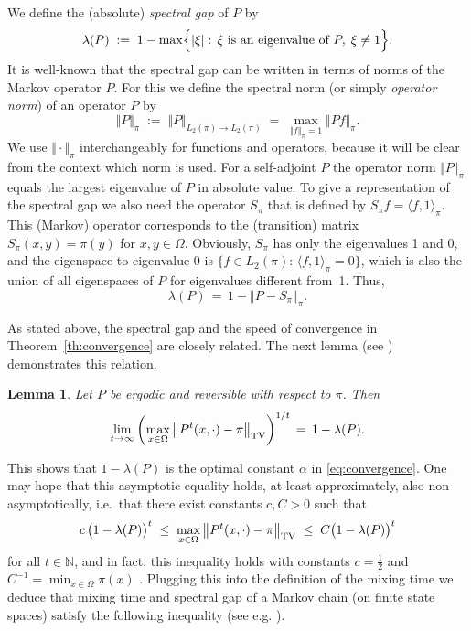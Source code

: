 \documentclass{dis}
\newtheorem{lemma}[theorem]{Lemma}
\theoremstyle{citing}
\begin{document}
We define the (absolute) 
\emph{spectral gap} 
of $P$ by 
\[
\lambda(P) \;:=\; 1 - \max\Bigl\{{\left\vert {\xi} \right\vert}:\, \xi 
		\text{ is an eigenvalue of } P,\; \xi\neq1\Bigr\}.
\]
It is well-known that the spectral gap can be written in terms 
of norms of the Markov operator $P$. For this we define the 
spectral norm (or simply \emph{operator norm}) 
of an operator $P$ by
\begin{equation} \label{eq:norm}
\Vert P\Vert_\pi \;:=\; \Vert P\Vert_{L_2(\pi)\to L_2(\pi)} 
\;=\; \max_{\Vert f\Vert_\pi=1} \Vert Pf\Vert_\pi.
\end{equation}
We use $\Vert\cdot\Vert_\pi$ interchangeably for functions and 
operators, because it will be clear from the context which 
norm is used. 
For a self-adjoint $P$ the operator norm $\Vert P\Vert_\pi$ equals 
the largest eigenvalue of $P$ in absolute value.
To give a representation of the spectral gap we also need the 
operator $S_\pi$ that is defined by $S_\pi f={\langle} f, 1{\rangle}_\pi$. 
This (Markov) operator corresponds to the (transition) matrix 
$S_\pi(x,y)=\pi(y)$ for $x,y\in{\Omega}$. Obviously, $S_\pi$ has only the 
eigenvalues 1 and 0, and the eigenspace to eigenvalue 0 is 
$\{f\in L_2(\pi):\, {\langle} f, 1{\rangle}_\pi=0\}$, which is also 
the union of all eigenspaces of $P$ for eigenvalues different 
from~1. Thus,
\vspace{1mm}
\begin{equation} \label{eq:gap-norm}
\lambda(P) \,=\, 1 - {\left\Vert {P-S_\pi} \right\Vert}_\pi.
\end{equation}

As stated above, the spectral gap and the speed of convergence 
in Theorem~\ref{th:convergence} are closely related.
The next lemma (see \cite[Coro.~12.6]{LPW}) demonstrates this relation.

\begin{lemma}\label{lemma:TV-gap}
Let $P$ be ergodic and reversible with respect to 
$\pi$. Then 
\[
\lim_{t\to\infty}\left(\max_{x\in{\Omega}} 
	{\left\Vert {P^t(x,\cdot)-\pi} \right\Vert_{\rm TV}}\right)^{1/t} \,=\, 1-\lambda(P).
\]
\end{lemma}

This shows that $1-\lambda(P)$ is the optimal constant 
${\alpha}$ in \eqref{eq:convergence}.
One may hope that this asymptotic equality holds, at least 
approximately, also non-asymptotically, i.e.~that there exist 
constants $c,C>0$ such that
\[
c \,\bigl(1-\lambda(P)\bigr)^t 
\;\le\; \max_{x\in{\Omega}}{\left\Vert {P^t(x,\cdot)-\pi} \right\Vert_{\rm TV}}
\;\le\; C \bigl(1-\lambda(P)\bigr)^t 
\]
for all $t\in{\ensuremath{\mathbb{N}}}$, and in fact, this inequality holds with 
constants $c=\frac12$ \cite[(12.13)]{LPW} and 
$C^{-1}=\min_{x\in{\Omega}}\pi(x)$ \cite[(12.11)]{LPW}.
Plugging this into the definition of the mixing time we 
deduce that 
mixing time and spectral gap of a Markov chain (on finite state spaces) 
satisfy the following inequality (see e.g. 
\cite[Theorem~12.3 \& 12.4]{LPW}).
\end{document}
